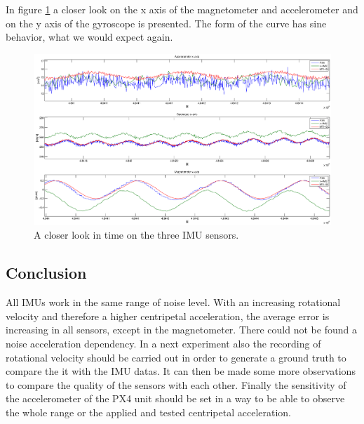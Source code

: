In figure \ref{ct_sine} a closer look on the x axis of the magnetometer and accelerometer and on the y axis of the gyroscope is presented. The form of the curve has sine behavior, what we would expect again.
\begin{figure}[h]
\includegraphics[width=1.2\textwidth]{pictures/ct_sine.eps}
\caption{A closer look in time on the three IMU sensors.}
\label{ct_sine}
\end{figure}

\subsection{Conclusion}
All IMUs work in the same range of noise level. With an increasing rotational velocity and therefore a higher centripetal acceleration, the average error is increasing in all sensors, except in the magnetometer. There could not be found a noise acceleration dependency. 
In a next experiment also the recording of rotational velocity should be carried out in order to generate a ground truth to compare the it with the IMU datas. It can then be made some more observations to compare the quality of the sensors with each other. Finally the sensitivity of the accelerometer of the PX4 unit should be set in a way to be able to observe the whole range or the applied and tested centripetal acceleration.

